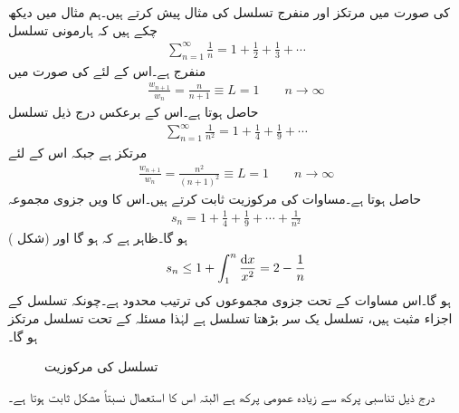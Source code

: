  کی صورت میں مرتکز اور منفرج تسلسل کی مثال پیش کرتے ہیں۔ہم مثال  میں دیکھ چکے ہیں کہ ہارمونی تسلسل 
\begin{align*}
\sum_{n=1}^{\infty} \frac{1}{n}=1+\frac{1}{2}+\frac{1}{3}+\cdots
\end{align*}
منفرج ہے۔اس کے لئے  کی صورت میں
\begin{align*}
\frac{w_{n+1}}{w_n}=\frac{n}{n+1}\equiv L=1 \quad \quad n\to \infty
\end{align*}
حاصل ہوتا ہے۔اس کے برعکس درج ذیل تسلسل
\begin{align}\label{مساوات_ترتیب_تسلسل_مربع_بالعکس}
\sum_{n=1}^{\infty}\frac{1}{n^2}=1+\frac{1}{4}+\frac{1}{9}+\cdots
\end{align}
مرتکز ہے جبکہ اس کے لئے
\begin{align*}
\frac{w_{n+1}}{w_n}=\frac{n^2}{(n+1)^2}\equiv L=1\quad \quad n\to\infty
\end{align*}
حاصل ہوتا ہے۔مساوات  کی مرکوزیت ثابت کرتے ہیں۔اس کا  ویں جزوی مجموعہ
\begin{align*}
s_n=1+\frac{1}{4}+\frac{1}{9}+\cdots+\frac{1}{n^2}
\end{align*}
ہو گا۔ظاہر ہے کہ  ہو گا  اور (شکل ) 
\begin{align*}
s_n\le 1+\int_{1}^{n}\frac{\dif x}{x^2}=2-\frac{1}{n}
\end{align*}
ہو گا۔اس مساوات کے تحت جزوی مجموعوں کی ترتیب  محدود ہے۔چونکہ تسلسل کے اجزاء مثبت ہیں، تسلسل یک سر بڑھتا  تسلسل ہے  لہٰذا مسئلہ  کے تحت تسلسل مرتکز ہو گا۔
\begin{figure}
\centering
{}
\caption{تسلسل  کی مرکوزیت}
\label{شکل_مساوات_ترتیب_تسلسل_مربع_بالعکس}
\end{figure}

درج ذیل تناسبی پرکھ سے  زیادہ عمومی پرکھ  ہے البتہ اس کا استعمال نسبتاً مشکل ثابت ہوتا ہے۔


